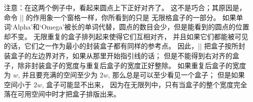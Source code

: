 \danger \1注意：在这两个例子中，看起来圆点上下正好对齐了。%
这不是巧合；其原因是，命令 |\leaders| 的作用象一个窗格一样，你所看到的只是%
无限格盒子的一部分。%
如果单词`Alpha'和`Omega'被长的单词代替，圆点的数目会少，但是能看到的圆点的位置却不变。%
无限重复的盒子排列起来使得它们互相对齐，
并且如果它们都能被可见的话，它们之一作为最小的封装盒子都有同样的参考点。%
因此，|\leaders| 把盒子按所封装盒子的左边界对齐，如果从那里开始指引线的话；
但是不能得到右对齐的盒子，除非封装盒子的宽度与重复后盒子的宽度正好整除。%
如果重复后盒子的宽度为 $w$, 并且要充满的空间至少为 $2w$, 那么总是可以至少看见一个盒子；
但是如果空间小于 $2w$, 盒子可能显不出来，
因为在无限列中，只有当盒子的整个宽度完全落在可用空间中时才把盒子排版出来。

